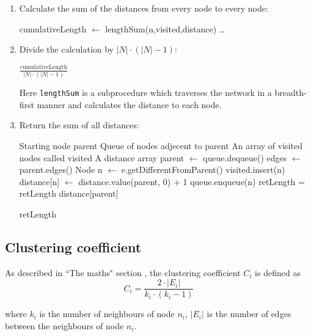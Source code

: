\documentclass[a4paper,11pt,titlepage]{article}
\newcommand{\code}[1]{\texttt{#1}}
\begin{document}
\begin{enumerate}

\item Calculate the sum of the distances from every node to every 
node:

\begin{algorithmic}
    \STATE cumulativeLength $\gets$ lengthSum(n,visited,distance)
    \STATE \dots
  \ENDFOR
\end{algorithmic}

\item Divide the calculation by $|N| \cdot (|N| - 1)$:

\begin{algorithmic}
  \RETURN $\frac{\mathrm{cumulativeLength}}{|N| \cdot (|N| - 1)}$
\end{algorithmic}

Here \code{lengthSum} is a subprocedure which traverses the network in a
breadth-first manner and calculates the distance to each node.

\item Return the sum of all distances:

\begin{algorithmic}
  \REQUIRE Starting node parent
  \REQUIRE Queue of nodes adjecent to parent
  \REQUIRE An array of visited nodes called visited
  \REQUIRE A distance array
    \STATE parent $\gets$ queue.dequeue()
    \STATE edges $\gets$ parent.edges()
    \STATE Node n $\gets$ e.getDifferentFromParent()
        \STATE visited.insert(n)
        \STATE distance[n] $\gets$ distance.value(parent, 0) + 1
        \STATE queue.enqueue(n)
      \ENDIF
    \ENDFOR
    \STATE retLength = retLength distance[parent]
  \ENDWHILE

  \RETURN retLength
\end{algorithmic}

\end{enumerate}

\subsection{Clustering coefficient}
As described in ``The maths" section \label{sec:clusteringcoefficient}, the
clustering coefficient $C_i$ is defined as
\[ C_i = \frac{2 \cdot |E_i|}{k_i \cdot (k_i-1)} \]

where $k_i$ is the number of neighbours of node $n_i$, $|E_i|$ is the number of edges between the neighbours of node $n_i$.
\end{document}
